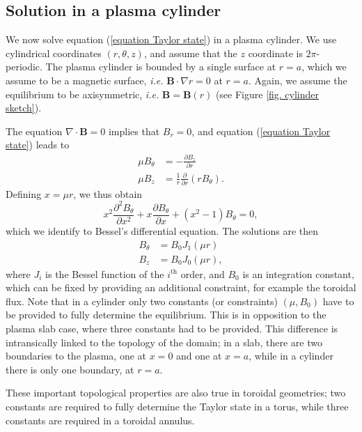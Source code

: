 \documentclass[my_thesis.tex]{subfiles}
\begin{document}
\subsection{Solution in a plasma cylinder}
We now solve equation (\ref{equation Taylor state}) in a plasma cylinder. We use cylindrical coordinates $(r,\theta,z)$, and assume that the $z$ coordinate is $2\pi$-periodic. The plasma cylinder is bounded by a single surface at $r=a$, which we assume to be a magnetic surface,  \textit{i.e.} $\mathbf{B}\cdot\nabla r=0$ at $r=a$. Again, we assume the equilibrium to be axisymmetric, \textit{i.e.} $\mathbf{B}=\mathbf{B}(r)$ (see Figure \ref{fig. cylinder sketch}).

The equation $\nabla\cdot\mathbf{B}=0$ implies that $B_r=0$, and equation (\ref{equation Taylor state}) leads to
\begin{align}
	\mu B_\theta &= -\frac{\partial B_z}{\partial r}\\
	\mu B_z &= \frac{1}{r}\frac{\partial}{\partial r}(rB_\theta).
\end{align}
Defining $x=\mu r$, we thus obtain
\begin{equation}
	x^2 \frac{\partial^2 B_\theta}{\partial x^2} + x \frac{\partial B_\theta}{\partial x} + (x^2-1) B_\theta = 0,
\end{equation}
which we identify to Bessel's differential equation. The solutions are then
\begin{align}
	B_\theta &= B_0 J_1(\mu r)\\
	B_z &= B_0 J_0(\mu r),
\end{align}
where $J_i$ is the Bessel function of the $i^{\text{th}}$ order, and $B_0$ is an integration constant, which can be fixed by providing an additional constraint, for example the toroidal flux. Note that in a cylinder only two constants (or constraints) $(\mu,B_0)$ have to be provided to fully determine the equilibrium. This is in opposition to the plasma slab case, where three constants had to be provided. This difference is intransically linked to the topology of the domain; in a slab, there are two boundaries to the plasma, one at $x=0$ and one at $x=a$, while in a cylinder there is only one boundary, at $r=a$. 

These important topological properties are also true in toroidal geometries; two constants are required to fully determine the Taylor state in a torus, while three constants are required in a toroidal annulus.
\end{document}

